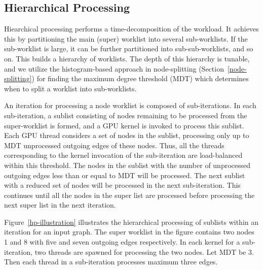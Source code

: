\subsection{Hierarchical Processing}\label{hierarchical-processing}
Hiearchical processing performs a time-decomposition of the workload.
It achieves this by partitioning the main (super) worklist into several sub-worklists. 
If the sub-worklist is large, it can be further partitioned into sub-sub-worklists, and so on. 
This builds a hierarchy of worklists. 
The depth of this hierarchy is tunable, and we utilize the histogram-based approach in node-splitting (Section~\ref{node-splitting}) for finding the maximum degree threshold (MDT) which determines when to split a worklist into sub-worklists.

An iteration for processing a node worklist is composed of sub-iterations. 
In each sub-iteration, a sublist consisting of nodes remaining to be processed from the super-worklist is formed, and a GPU kernel is invoked to process this sublist. 
Each GPU thread considers a set of nodes in the sublist, processing only up to MDT unprocessed outgoing edges of these nodes. 
Thus, all the threads corresponding to the kernel invocation of the sub-iteration are load-balanced within this threshold. 
The nodes in the sublist with the number of unprocessed outgoing edges less than or equal to MDT will be processed. %
The next sublist with a reduced set of nodes will be processed in the next sub-iteration. 
This continues until all the nodes in the super list are processed before processing the next super list in the next iteration. 

Figure~\ref{hp-illustration} illustrates the hierarchical processing of sublists within an iteration for an input graph. 
The super worklist in the figure contains two nodes 1 and 8 with five and seven outgoing edges respectively. 
In each kernel for a sub-iteration, two threads are spawned for processing the two nodes.
Let MDT be $3$. Then each thread in a sub-iteration processes maximum three edges.

